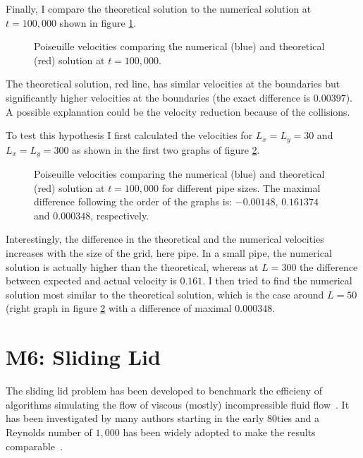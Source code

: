 \documentclass[a4paper,11pt, oneside]{book}
\begin{document}
Finally, I compare the theoretical solution to the numerical solution at $t=100,000$ shown in figure \ref{fig:m5-1-num-theo}.
\begin{figure}[ht]
\centering
\resizebox{0.7\columnwidth}{!}{\large}
\caption[Poiseuille numerical vs analytical]{Poiseuille velocities comparing the numerical (blue) and theoretical (red) solution at $t=100,000$.}
\label{fig:m5-1-num-theo}
\end{figure}
The theoretical solution, red line, has similar velocities at the boundaries but significantly higher velocities at the boundaries (the exact difference is $0.00397$).
A possible explanation could be the velocity reduction because of the collisions.

To test this hypothesis I first calculated the velocities for $L_x=L_y=30$ and $L_x=L_y=300$ as shown in the first two graphs of figure \ref{fig:m5-1-num-theo-extended}.
\begin{figure}[ht]
\centering
\resizebox{\columnwidth}{!}{\large}
\caption[Poiseuille analysis extended]{Poiseuille velocities comparing the numerical (blue) and theoretical (red) solution at $t=100,000$ for different pipe sizes. The maximal difference following the order of the graphs is: $-0.00148$, $0.161374$ and $0.000348$, respectively.}
\label{fig:m5-1-num-theo-extended}
\end{figure}
Interestingly, the difference in the theoretical and the numerical velocities increases with the size of the grid, here pipe. In a small pipe, the numerical solution is actually higher than the theoretical, whereas at $L=300$ the difference between expected and actual velocity is $0.161$. 
I then tried to find the numerical solution most similar to the theoretical solution, which is the case around $L=50$ (right graph in figure \ref{fig:m5-1-num-theo-extended} with a difference of maximal $0.000348$.


\section{M6: Sliding Lid}
The sliding lid problem has been developed to benchmark the efficieny of algorithms simulating the flow of viscous (mostly) incompressible fluid flow~\cite{bruneau20062-lid-cavity}.
It has been investigated by many authors starting in the early 80ties and a Reynolds number of $1,000$ has been widely adopted to make the results comparable~\cite{bruneau20062-lid-cavity}.
\end{document}
